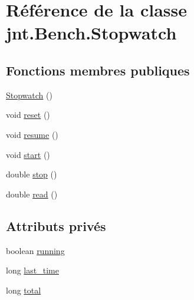 \hypertarget{classjnt_1_1Bench_1_1Stopwatch}{\section{Référence de la classe jnt.\-Bench.\-Stopwatch}
\label{classjnt_1_1Bench_1_1Stopwatch}
}
\subsection*{Fonctions membres publiques}
\begin{DoxyCompactItemize}
\item 
\hyperlink{classjnt_1_1Bench_1_1Stopwatch_aa6504215d7507057731bac58d84b392f}{Stopwatch} ()
\item 
void \hyperlink{classjnt_1_1Bench_1_1Stopwatch_a3caeba308010905f2705b7d4f66cf55f}{reset} ()
\item 
void \hyperlink{classjnt_1_1Bench_1_1Stopwatch_a9bac3f537a5ef70c09530483e4384b50}{resume} ()
\item 
void \hyperlink{classjnt_1_1Bench_1_1Stopwatch_a2449b37f8bead3218c6d912b03a5c034}{start} ()
\item 
double \hyperlink{classjnt_1_1Bench_1_1Stopwatch_a2138dc3daabedc78480f3f6434673c89}{stop} ()
\item 
double \hyperlink{classjnt_1_1Bench_1_1Stopwatch_a60efa1d72bd5eb1df41b77480a833df7}{read} ()
\end{DoxyCompactItemize}
\subsection*{Attributs privés}
\begin{DoxyCompactItemize}
\item 
boolean \hyperlink{classjnt_1_1Bench_1_1Stopwatch_aa0a2a8cae25b4860113e0f89ff7d01b5}{running}
\item 
long \hyperlink{classjnt_1_1Bench_1_1Stopwatch_a886c0806e96b71415c5911dad7380206}{last\-\_\-time}
\item 
long \hyperlink{classjnt_1_1Bench_1_1Stopwatch_a3c184cc059a96f96394d3520fbd20599}{total}
\end{DoxyCompactItemize}


